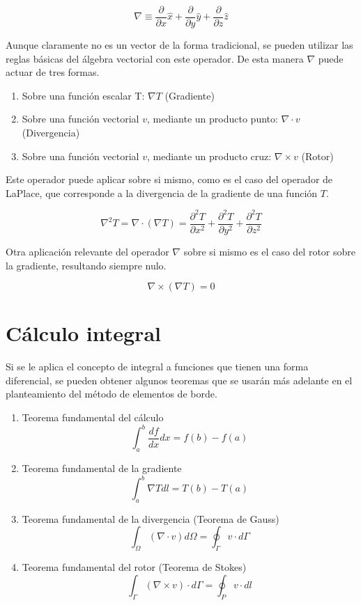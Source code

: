 \documentclass[12pt,letterpaper]{article}
\numberwithin{equation}{section}
\begin{document}
$$\nabla\equiv\frac{\partial}{\partial x}\hat{x}+\frac{\partial}{\partial y}\hat{y}+\frac{\partial}{\partial z}\hat{z}$$ 

\noindent Aunque claramente no es un vector de la forma tradicional, se pueden utilizar las reglas básicas del álgebra vectorial con este operador. De esta manera $\nabla$ puede actuar de tres formas.

\begin{enumerate}
	\item Sobre una función escalar T: $\nabla T$ (Gradiente)
	\item Sobre una función vectorial $v$, mediante un producto punto: $\nabla\cdot v$ (Divergencia)
	\item Sobre una función vectorial $v$, mediante un producto cruz: $\nabla\times v$ (Rotor)
\end{enumerate}

\noindent Este operador puede aplicar sobre si mismo, como es el caso del operador de LaPlace, que corresponde a la divergencia de la gradiente de una función $T$.

$$\nabla^2 T=\nabla\cdot (\nabla T)=\frac{\partial^2 T}{\partial x^2}+\frac{\partial^2 T}{\partial y^2}+\frac{\partial^2 T}{\partial z^2}$$

\noindent Otra aplicación relevante del operador $\nabla$ sobre si mismo es el caso del rotor sobre la gradiente, resultando siempre nulo.

$$\nabla\times(\nabla T)=0$$

\pagebreak
\section*{Cálculo integral}
Si se le aplica el concepto de integral a funciones que tienen una forma diferencial, se pueden obtener algunos teoremas que se usarán más adelante en el planteamiento del método de elementos de borde.

\begin{enumerate}
	\item Teorema fundamental del cálculo
	$$\int_{a}^{b}\frac{df}{dx}dx=f(b)-f(a)$$
	\item Teorema fundamental de la gradiente
	$$\int_{a}^{b}\nabla Tdl=T(b)-T(a)$$
	\item Teorema fundamental de la divergencia (Teorema de Gauss)
	$$\int_{\Omega}(\nabla\cdot v)d\varOmega=\oint_{\Gamma}v\cdot d\varGamma$$
	\item Teorema fundamental del rotor (Teorema de Stokes)
	$$\int_{\Gamma}(\nabla\times v)\cdot d\varGamma=\oint_{P}v\cdot dl$$ 
\end{enumerate}
\end{document}
